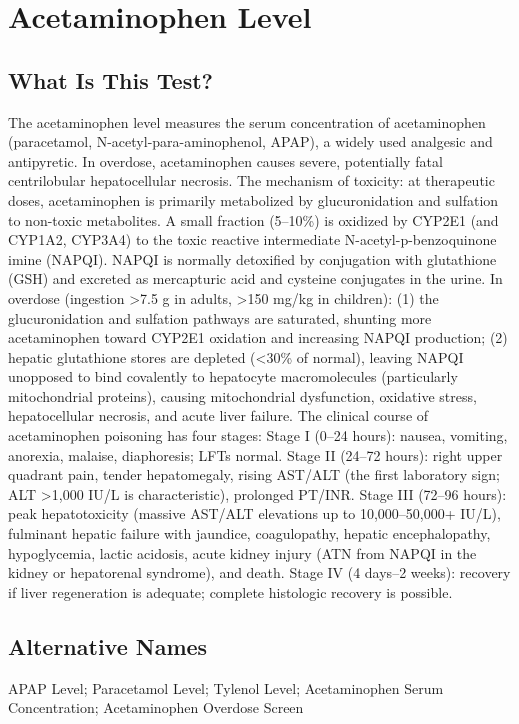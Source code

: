 \chapter{Acetaminophen Level}
\section*{What Is This Test?}
The acetaminophen level measures the serum concentration of acetaminophen (paracetamol, N-acetyl-para-aminophenol, APAP), a widely used analgesic and antipyretic. In overdose, acetaminophen causes severe, potentially fatal centrilobular hepatocellular necrosis. The mechanism of toxicity: at therapeutic doses, acetaminophen is primarily metabolized by glucuronidation and sulfation to non-toxic metabolites. A small fraction (5--10\%) is oxidized by CYP2E1 (and CYP1A2, CYP3A4) to the toxic reactive intermediate N-acetyl-p-benzoquinone imine (NAPQI). NAPQI is normally detoxified by conjugation with glutathione (GSH) and excreted as mercapturic acid and cysteine conjugates in the urine. In overdose (ingestion >7.5 g in adults, >150 mg/kg in children): (1) the glucuronidation and sulfation pathways are saturated, shunting more acetaminophen toward CYP2E1 oxidation and increasing NAPQI production; (2) hepatic glutathione stores are depleted (<30\% of normal), leaving NAPQI unopposed to bind covalently to hepatocyte macromolecules (particularly mitochondrial proteins), causing mitochondrial dysfunction, oxidative stress, hepatocellular necrosis, and acute liver failure. The clinical course of acetaminophen poisoning has four stages: Stage I (0--24 hours): nausea, vomiting, anorexia, malaise, diaphoresis; LFTs normal. Stage II (24--72 hours): right upper quadrant pain, tender hepatomegaly, rising AST/ALT (the first laboratory sign; ALT >1,000 IU/L is characteristic), prolonged PT/INR. Stage III (72--96 hours): peak hepatotoxicity (massive AST/ALT elevations up to 10,000--50,000+ IU/L), fulminant hepatic failure with jaundice, coagulopathy, hepatic encephalopathy, hypoglycemia, lactic acidosis, acute kidney injury (ATN from NAPQI in the kidney or hepatorenal syndrome), and death. Stage IV (4 days--2 weeks): recovery if liver regeneration is adequate; complete histologic recovery is possible.
\section*{Alternative Names}
APAP Level; Paracetamol Level; Tylenol Level; Acetaminophen Serum Concentration; Acetaminophen Overdose Screen
